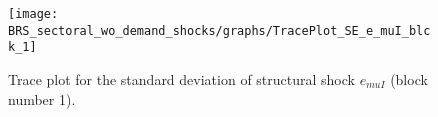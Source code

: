 \begin{figure}[H]
\centering
  \texttt{[image: BRS\_sectoral\_wo\_demand\_shocks/graphs/TracePlot\_SE\_e\_muI\_blck\_1]}\\
    \caption{Trace plot for the standard deviation of structural shock ${e_{muI}}$ (block number 1).}
\end{figure}
